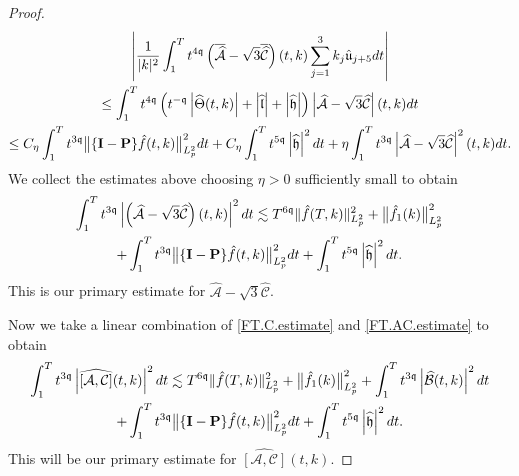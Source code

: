 \documentclass[10pt,a4paper]{amsart}
\newcommand{\highG}{\Theta}
\newcommand{\micro}{{\bf \{I- P\}}}
\def\norm#1{\big\Vert#1\big\Vert}
\newcommand{\pv}{p}
\newcommand{\qq}{\mathfrak{q}}
\newcommand{\tTq}{t^{3\qq}}
\newcommand{\tmq}{t^{-\qq}}
\begin{document}
\begin{proof}
\begin{multline*}
\left|  \frac{1}{|k|^2} 
\int_1^{T} t^{4\qq}\left( \overline{\widehat{\mathcal{A}}}- \sqrt{3}\overline{\widehat{\mathcal{C}}}\right)(t,k)  \sum_{j=1}^3 k_j\hat{\mathfrak{u}}_{j+5} dt
 \right|
\\
\leq
\int_1^{T}
 t^{4\qq}\left( \tmq\left|\widehat{\highG}(t,k)\right|+\left| \widehat{\mathfrak{l}}\right|+\left| \widehat{\mathfrak{h}}\right|\right) \left|{\widehat{\mathcal{A}}}- \sqrt{3}{\widehat{\mathcal{C}}}\right|(t,k) dt
\\
\leq
C_\eta\int_1^{T} \tTq\norm{\micro \hat{f}(t,k)}_{L^2_{\pv}}^2dt
  +
  C_\eta\int_1^{T} t^{5\qq}\left| \widehat{\mathfrak{h}}\right|^2dt
+
\eta \int^{T}_{1} \tTq \left|{\widehat{\mathcal{A}}}- \sqrt{3}{\widehat{\mathcal{C}}}\right|^2(t,k) dt. 
\end{multline*}
We collect the estimates above choosing $\eta>0$ sufficiently small to obtain
\begin{multline}\label{FT.AC.estimate}
\int_1^{T} \tTq\left|\left( {\widehat{\mathcal{A}}}- \sqrt{3}{\widehat{\mathcal{C}}}\right)(t,k)\right|^2  dt
\lesssim
 T^{6\qq}\Vert \hat{f}(T,k)\Vert_{L^2_{\pv}}^2+\norm{ \hat{f}_1(k)}_{L^2_{\pv}}^2
 \\
 +
\int_1^{T} \tTq\norm{\micro \hat{f}(t,k)}_{L^2_{\pv}}^2dt
+
\int_1^{T} t^{5\qq}\left| \widehat{\mathfrak{h}}\right|^2dt.
\end{multline}
This is our primary estimate for ${\widehat{\mathcal{A}}}- \sqrt{3}{\widehat{\mathcal{C}}}$.



Now we take a linear combination of \eqref{FT.C.estimate} and \eqref{FT.AC.estimate} to obtain 
\begin{multline}\label{FT.ACt.estimate}
    \int^{T}_{1} \tTq \left|\widehat{[\mathcal{A},\mathcal{C}]}(t,k)\right|^2 dt
    \lesssim
     T^{6\qq}\Vert \hat{f}(T,k)\Vert_{L^2_{\pv}}^2+\norm{ \hat{f}_1(k)}_{L^2_{\pv}}^2
  +
 \int^{T}_{1} \tTq \left|\widehat{{\mathcal{B}}}(t,k)\right|^2 dt 
 \\
+\int_1^{T} \tTq\norm{\micro \hat{f}(t,k)}_{L^2_{\pv}}^2dt
+\int_1^{T} t^{5\qq}\left| \widehat{\mathfrak{h}}\right|^2dt.
\end{multline}
This will be our primary estimate for $\widehat{[\mathcal{A},\mathcal{C}]}(t,k)$.







\end{proof}
\end{document}

